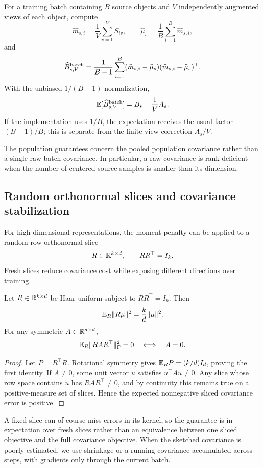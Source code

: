 For a training batch containing $B$ source objects and $V$ independently
augmented views of each object, compute
\[
\widehat m_{s,i}
=
\frac1V\sum_{v=1}^V S_{iv},
\qquad
\widehat\mu_s
=
\frac1B\sum_{i=1}^B\widehat m_{s,i},
\]
and
\[
\widehat B_{s,V}^{\rm batch}
=
\frac1{B-1}
\sum_{i=1}^B
(\widehat m_{s,i}-\widehat\mu_s)
(\widehat m_{s,i}-\widehat\mu_s)^\top.
\]
With the unbiased $1/(B-1)$ normalization,
\[
\mathbb{E}[\widehat B_{s,V}^{\rm batch}]
=
B_s+\frac1V A_s.
\]
If the implementation uses $1/B$, the expectation receives the usual factor
$(B-1)/B$; this is separate from the finite-view correction $A_s/V$.

The population guarantees concern the pooled population covariance rather than a
single raw batch covariance. In particular, a raw covariance is rank deficient
when the number of centered source samples is smaller than its dimension.

\subsection{Random orthonormal slices and covariance stabilization}

For high-dimensional representations, the moment penalty can be applied to a
random row-orthonormal slice
\[
R\in\mathbb{R}^{k\times d},
\qquad
RR^\top=I_k.
\]
Fresh slices reduce covariance cost while exposing different directions over
training.

\begin{theorem}
\label{thm:random-slices}
Let $R\in\mathbb{R}^{k\times d}$ be Haar-uniform subject to $RR^\top=I_k$. Then
\[
\mathbb{E}_R\lVert R\mu\rVert^2
=
\frac{k}{d}\lVert \mu\rVert^2.
\]
For any symmetric $A\in\mathbb{R}^{d\times d}$,
\[
\mathbb{E}_R\lVert RAR^\top\rVert_{\rm F}^2=0
\quad\Longleftrightarrow\quad
A=0.
\]
\end{theorem}

\begin{proof}
Let $P=R^\top R$. Rotational symmetry gives
$\mathbb{E}_RP=(k/d)I_d$, proving the first identity. If $A\ne0$, some unit vector $u$
satisfies $u^\top Au\ne0$. Any slice whose row space contains $u$ has
$RAR^\top\ne0$, and by continuity this remains true on a positive-measure set of
slices. Hence the expected nonnegative sliced covariance error is positive.
\end{proof}

A fixed slice can of course miss errors in its kernel, so the guarantee is in
expectation over fresh slices rather than an equivalence between one sliced
objective and the full covariance objective. When the sketched covariance is
poorly estimated, we use shrinkage or a running covariance accumulated across
steps, with gradients only through the current batch.

